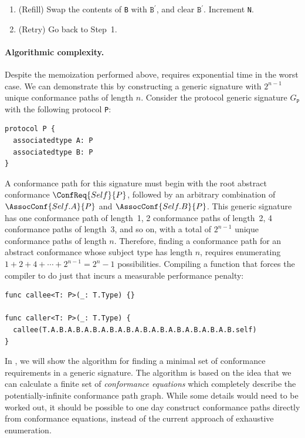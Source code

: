 \documentclass[../generics]{subfiles}
\begin{document}
\begin{algorithm}
\begin{enumerate}
\begin{enumerate}
\item (Successors) For every associated conformance requirement $\AssocConf{Self.$\texttt{A}_i$}{$\texttt{P}_i$}$ of protocol $\texttt{P}_c$, add the conformance path $\AssocConf{Self.$\texttt{A}_i$}{$\texttt{P}_i$}\otimes c$ to $\texttt{B}^\prime$.
\end{enumerate}

\item (Refill) Swap the contents of \texttt{B} with $\texttt{B}^\prime$, and clear $\texttt{B}^\prime$. Increment \texttt{N}.

\item (Retry) Go back to Step~1.
\end{enumerate}
\end{algorithm}

\paragraph{Algorithmic complexity.}
Despite the memoization performed above,  requires exponential time in the worst case. We can demonstrate this by constructing a generic signature with $2^{n-1}$ unique conformance paths of length $n$. Consider the protocol generic signature $G_\texttt{P}$ with the following protocol \texttt{P}:
\begin{Verbatim}
protocol P {
  associatedtype A: P
  associatedtype B: P
}
\end{Verbatim}

A conformance path for this signature must begin with the root abstract conformance $\ConfReq{Self}{P}$, followed by an arbitrary combination of $\AssocConf{Self.A}{P}$ and $\AssocConf{Self.B}{P}$. This generic signature has one conformance path of length~1, 2 conformance paths of length~2, 4 conformance paths of length~3, and so on, with a total of $2^{n-1}$ unique conformance paths of length $n$. Therefore, finding a conformance path for an abstract conformance whose subject type has length $n$, requires enumerating $1+2+4+\cdots+2^{n-1}=2^n-1$ possibilities. Compiling a function that forces the compiler to do just that incurs a measurable performance penalty:
\begin{Verbatim}
func callee<T: P>(_: T.Type) {}

func caller<T: P>(_: T.Type) {
  callee(T.A.B.A.B.A.B.A.B.A.B.A.B.A.B.A.B.A.B.A.B.A.B.self)
}
\end{Verbatim}

In , we will show the algorithm for finding a minimal set of conformance requirements in a generic signature. The algorithm is based on the idea that we can calculate a finite set of \emph{conformance equations} which completely describe the potentially-infinite conformance path graph. While some details would need to be worked out, it should be possible to one day construct conformance paths directly from conformance equations, instead of the current approach of exhaustive enumeration.
\end{document}
